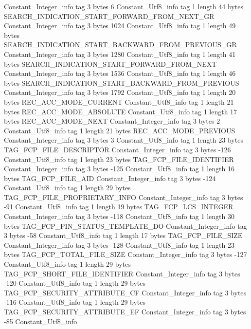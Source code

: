 {{{		}
		Constant_Integer_info {
			tag	3
			bytes	6
		}
		Constant_Utf8_info {
			tag	1
			length	44
			bytes	SEARCH_INDICATION_START_FORWARD_FROM_NEXT_GR
		}
		Constant_Integer_info {
			tag	3
			bytes	1024
		}
		Constant_Utf8_info {
			tag	1
			length	49
			bytes	SEARCH_INDICATION_START_BACKWARD_FROM_PREVIOUS_GR
		}
		Constant_Integer_info {
			tag	3
			bytes	1280
		}
		Constant_Utf8_info {
			tag	1
			length	41
			bytes	SEARCH_INDICATION_START_FORWARD_FROM_NEXT
		}
		Constant_Integer_info {
			tag	3
			bytes	1536
		}
		Constant_Utf8_info {
			tag	1
			length	46
			bytes	SEARCH_INDICATION_START_BACKWARD_FROM_PREVIOUS
		}
		Constant_Integer_info {
			tag	3
			bytes	1792
		}
		Constant_Utf8_info {
			tag	1
			length	20
			bytes	REC_ACC_MODE_CURRENT
		}
		Constant_Utf8_info {
			tag	1
			length	21
			bytes	REC_ACC_MODE_ABSOLUTE
		}
		Constant_Utf8_info {
			tag	1
			length	17
			bytes	REC_ACC_MODE_NEXT
		}
		Constant_Integer_info {
			tag	3
			bytes	2
		}
		Constant_Utf8_info {
			tag	1
			length	21
			bytes	REC_ACC_MODE_PREVIOUS
		}
		Constant_Integer_info {
			tag	3
			bytes	3
		}
		Constant_Utf8_info {
			tag	1
			length	23
			bytes	TAG_FCP_FILE_DESCRIPTOR
		}
		Constant_Integer_info {
			tag	3
			bytes	-126
		}
		Constant_Utf8_info {
			tag	1
			length	23
			bytes	TAG_FCP_FILE_IDENTIFIER
		}
		Constant_Integer_info {
			tag	3
			bytes	-125
		}
		Constant_Utf8_info {
			tag	1
			length	16
			bytes	TAG_FCP_FILE_AID
		}
		Constant_Integer_info {
			tag	3
			bytes	-124
		}
		Constant_Utf8_info {
			tag	1
			length	29
			bytes	TAG_FCP_FILE_PROPRIETARY_INFO
		}
		Constant_Integer_info {
			tag	3
			bytes	-91
		}
		Constant_Utf8_info {
			tag	1
			length	19
			bytes	TAG_FCP_LCS_INTEGER
		}
		Constant_Integer_info {
			tag	3
			bytes	-118
		}
		Constant_Utf8_info {
			tag	1
			length	30
			bytes	TAG_FCP_PIN_STATUS_TEMPLATE_DO
		}
		Constant_Integer_info {
			tag	3
			bytes	-58
		}
		Constant_Utf8_info {
			tag	1
			length	17
			bytes	TAG_FCP_FILE_SIZE
		}
		Constant_Integer_info {
			tag	3
			bytes	-128
		}
		Constant_Utf8_info {
			tag	1
			length	23
			bytes	TAG_FCP_TOTAL_FILE_SIZE
		}
		Constant_Integer_info {
			tag	3
			bytes	-127
		}
		Constant_Utf8_info {
			tag	1
			length	29
			bytes	TAG_FCP_SHORT_FILE_IDENTIFIER
		}
		Constant_Integer_info {
			tag	3
			bytes	-120
		}
		Constant_Utf8_info {
			tag	1
			length	29
			bytes	TAG_FCP_SECURITY_ATTRIBUTE_CF
		}
		Constant_Integer_info {
			tag	3
			bytes	-116
		}
		Constant_Utf8_info {
			tag	1
			length	29
			bytes	TAG_FCP_SECURITY_ATTRIBUTE_EF
		}
		Constant_Integer_info {
			tag	3
			bytes	-85
		}
		Constant_Utf8_info {
}}}
